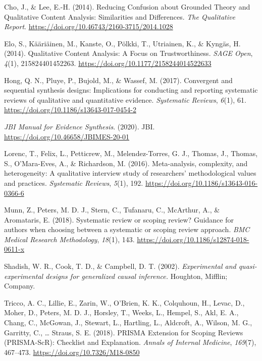 \documentclass[
  letterpaper,
  DIV=11,
  numbers=noendperiod]{scrartcl}
\newlength{\cslhangindent}
\newlength{\cslentryspacingunit} %
\newenvironment{CSLReferences}[2] %
 {%
  \setlength{\parindent}{0pt}
  \ifodd #1
  \let\oldpar\par
  \def\par{\hangindent=\cslhangindent\oldpar}
  \fi
  \setlength{\parskip}{#2\cslentryspacingunit}
 }%
 {}
\begin{document}
\hypertarget{refs}{}
\begin{CSLReferences}{1}{0}
\leavevmode{}%
Cho, J., \& Lee, E.-H. (2014). Reducing {Confusion} about {Grounded}
{Theory} and {Qualitative} {Content} {Analysis}: {Similarities} and
{Differences}. \emph{The Qualitative Report}.
\url{https://doi.org/10.46743/2160-3715/2014.1028}

\leavevmode{}%
Elo, S., Kääriäinen, M., Kanste, O., Pölkki, T., Utriainen, K., \&
Kyngäs, H. (2014). Qualitative {Content} {Analysis}: {A} {Focus} on
{Trustworthiness}. \emph{SAGE Open}, \emph{4}(1), 215824401452263.
\url{https://doi.org/10.1177/2158244014522633}

\leavevmode{}%
Hong, Q. N., Pluye, P., Bujold, M., \& Wassef, M. (2017). Convergent and
sequential synthesis designs: Implications for conducting and reporting
systematic reviews of qualitative and quantitative evidence.
\emph{Systematic Reviews}, \emph{6}(1), 61.
\url{https://doi.org/10.1186/s13643-017-0454-2}

\leavevmode{}%
\emph{{JBI} {Manual} for {Evidence} {Synthesis}}. (2020). JBI.
\url{https://doi.org/10.46658/JBIMES-20-01}

\leavevmode{}%
Lorenc, T., Felix, L., Petticrew, M., Melendez-Torres, G. J., Thomas,
J., Thomas, S., O'Mara-Eves, A., \& Richardson, M. (2016).
Meta-analysis, complexity, and heterogeneity: A qualitative interview
study of researchers' methodological values and practices.
\emph{Systematic Reviews}, \emph{5}(1), 192.
\url{https://doi.org/10.1186/s13643-016-0366-6}

\leavevmode{}%
Munn, Z., Peters, M. D. J., Stern, C., Tufanaru, C., McArthur, A., \&
Aromataris, E. (2018). Systematic review or scoping review? {Guidance}
for authors when choosing between a systematic or scoping review
approach. \emph{BMC Medical Research Methodology}, \emph{18}(1), 143.
\url{https://doi.org/10.1186/s12874-018-0611-x}

\leavevmode{}%
Shadish, W. R., Cook, T. D., \& Campbell, D. T. (2002).
\emph{Experimental and quasi-experimental designs for generalized causal
inference.} Houghton, Mifflin; Company.

\leavevmode{}%
Tricco, A. C., Lillie, E., Zarin, W., O'Brien, K. K., Colquhoun, H.,
Levac, D., Moher, D., Peters, M. D. J., Horsley, T., Weeks, L., Hempel,
S., Akl, E. A., Chang, C., McGowan, J., Stewart, L., Hartling, L.,
Aldcroft, A., Wilson, M. G., Garritty, C., \ldots{} Straus, S. E.
(2018). {PRISMA} {Extension} for {Scoping} {Reviews} ({PRISMA}-{ScR}):
{Checklist} and {Explanation}. \emph{Annals of Internal Medicine},
\emph{169}(7), 467--473. \url{https://doi.org/10.7326/M18-0850}

\end{CSLReferences}
\end{document}
